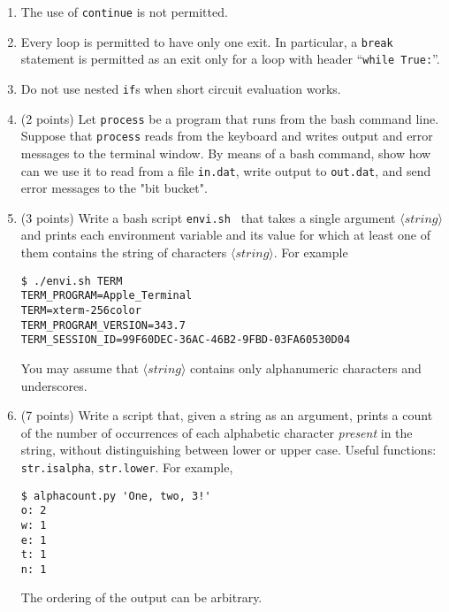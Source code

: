 \documentclass[11pt]{article}
\begin{document}
\begin{enumerate}

\item[] The use of {\tt continue} is not permitted.

\item[] Every loop is permitted to have only one exit.
  In particular, a {\tt break} statement is permitted as an exit only
  for a loop with header ``{\tt while True:}''.

\item[] Do not use nested {\tt if}s when short circuit evaluation works.

\item (2 points)  %
 Let {\tt process} be a program that runs from the bash command line.
 Suppose that {\tt process} reads from the keyboard
 and writes output and error messages to the terminal window.
 By means of a bash command,
 show how can we use it to read from a file {\tt in.dat},
 write output to {\tt out.dat}, and send error messages to the "bit bucket".


\item (3 points)  %
 Write a bash script {\tt envi.sh }
 that takes a single argument $\langle\mathit{string}\rangle$
 and prints each environment variable and its value
 for which at least one of them
 contains the string of characters $\langle\mathit{string}\rangle$.
 For example
  {\small\begin{verbatim}
$ ./envi.sh TERM
TERM_PROGRAM=Apple_Terminal
TERM=xterm-256color
TERM_PROGRAM_VERSION=343.7
TERM_SESSION_ID=99F60DEC-36AC-46B2-9FBD-03FA60530D04
\end{verbatim}}\noindent
 You may assume that $\langle\mathit{string}\rangle$ contains only alphanumeric
 characters and underscores.


\item (7 points)  %
 Write a script that, given a string as an argument,
 prints a count of the number of occurrences of each
 alphabetic character {\em present} in the string,
 without distinguishing between lower or upper case.
 Useful functions: {\tt str.isalpha}, {\tt str.lower}.
 For example,
 {\small\begin{verbatim}
$ alphacount.py 'One, two, 3!'
o: 2
w: 1
e: 1
t: 1
n: 1
\end{verbatim}}\noindent  %
The ordering of the output can be arbitrary.



\end{enumerate}
\end{document}
